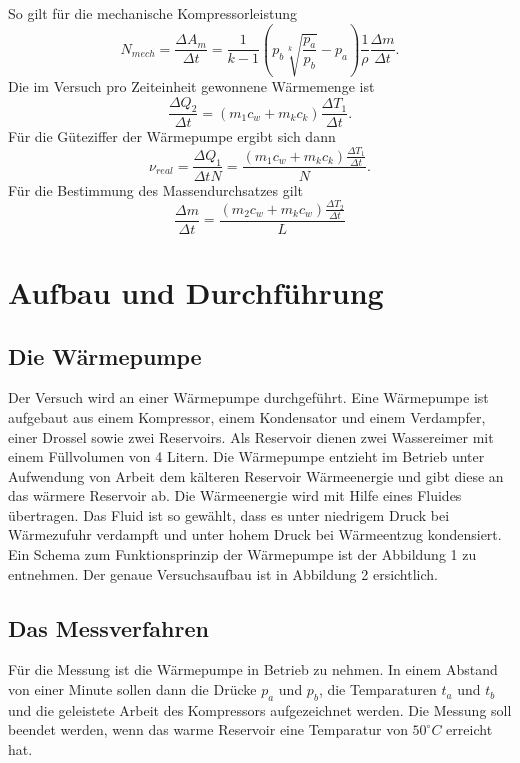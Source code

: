\documentclass[11pt]{article}
\begin{document}
So gilt für die mechanische Kompressorleistung
\begin{equation}
\label{F7}
N_{mech} = \frac{\Delta A_m}{\Delta t} = \frac{1}{k-1} \left(p_b \sqrt[k]{\frac{p_a}{p_b}}-p_a \right) \frac{1}{\rho} \frac{\Delta m}{\Delta t}.
\end{equation}
Die im Versuch pro Zeiteinheit gewonnene Wärmemenge ist
\begin{equation}
\label{F8}
\frac{\Delta Q_2}{\Delta t} = (m_1c_w + m_kc_k) \frac{\Delta T_1}{\Delta t}.
\end{equation}
Für die Güteziffer der Wärmepumpe ergibt sich dann
\begin{equation}
\label{F9}
\nu_{real} = \frac{\Delta Q_1}{\Delta t N} = \frac{(m_1c_w + m_kc_k) \frac{\Delta T_1}{\Delta t}}{N}.
\end{equation}
Für die Bestimmung des Massendurchsatzes gilt
\begin{equation}
\label{F10}
\frac{\Delta m}{\Delta t} = \frac{(m_2 c_w + m_k c_w) \frac{\Delta T_2}{\Delta t}}{L}
\end{equation}

\section{Aufbau und Durchf\"{u}hrung}
\subsection{Die Wärmepumpe}
Der Versuch wird an einer Wärmepumpe durchgeführt. Eine Wärmepumpe ist aufgebaut aus einem Kompressor, einem Kondensator und einem Verdampfer, einer Drossel sowie zwei Reservoirs. Als Reservoir dienen zwei Wassereimer mit einem Füllvolumen von 4 Litern. Die Wärmepumpe entzieht im Betrieb unter Aufwendung von Arbeit dem kälteren Reservoir Wärmeenergie und gibt diese an das wärmere Reservoir ab. Die Wärmeenergie wird mit Hilfe eines Fluides übertragen. Das Fluid ist so gewählt, dass es unter niedrigem Druck bei Wärmezufuhr verdampft und unter hohem Druck bei Wärmeentzug kondensiert. Ein Schema zum Funktionsprinzip der Wärmepumpe ist der Abbildung 1 zu entnehmen. Der genaue Versuchsaufbau ist in Abbildung 2 ersichtlich.
\subsection{Das Messverfahren}
Für die Messung ist die Wärmepumpe in Betrieb zu nehmen. In einem Abstand von einer Minute sollen dann die Drücke $p_a$ und $p_b$, die Temparaturen $t_a$ und $t_b$ und die geleistete Arbeit des Kompressors aufgezeichnet werden. Die Messung soll beendet werden, wenn das warme Reservoir eine Temparatur von $50^ \circ C$ erreicht hat.
\end{document}
